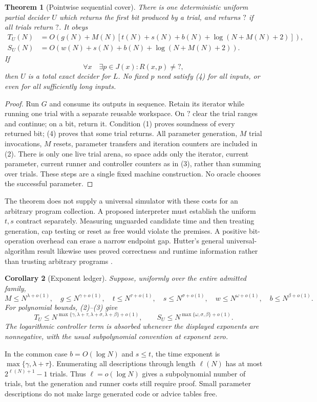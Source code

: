 \documentclass[11pt]{article}
\newtheorem{theorem}{Theorem}
\newtheorem{corollary}[theorem]{Corollary}
\begin{document}
\begin{theorem}[Pointwise sequential cover]\label{thm:cover}
There is one deterministic uniform partial decider $U$ which returns the first
bit produced by a trial, and returns $?$ if all trials return $?$.
It obeys
\begin{align}
 T_U(N)&=O\!\left(g(N)+M(N)[t(N)+s(N)+b(N)+\log(N+M(N)+2)]\right), \tag{2}\\
 S_U(N)&=O\!\left(w(N)+s(N)+b(N)+\log(N+M(N)+2)\right).           \tag{3}
\end{align}
If
\[
 \forall x\quad\exists p\in J(x):R(x,p)\ne ?,                 \tag{4}
\]
then $U$ is a total exact decider for $L$. No fixed $p$ need satisfy (4) for
all inputs, or even for all sufficiently long inputs.
\end{theorem}
\begin{proof}
Run $G$ and consume its outputs in sequence. Retain its iterator while running
one trial with a separate reusable workspace. On $?$ clear the trial ranges
and continue; on a bit, return it. Condition (1) proves soundness of every
returned bit; (4) proves that some trial returns. All parameter generation,
$M$ trial invocations, $M$ resets, parameter transfers and iteration counters
are included in (2). There is only one live trial arena, so space adds only
the iterator, current parameter, current runner and controller counters as in
(3), rather than summing over trials. These steps are a single fixed machine
construction. No oracle chooses the successful parameter.
\end{proof}

The theorem does not supply a universal simulator with these costs for an
arbitrary program collection. A proposed interpreter must establish the
uniform $t,s$ contract separately. Measuring unguarded candidate time and
then treating generation, cap testing or reset as free would violate the
premises. A positive bit-operation overhead can erase a narrow endpoint gap.
Hutter's general universal-algorithm result likewise uses proved correctness
and runtime information rather than trusting arbitrary programs \cite{hutter}.

\begin{corollary}[Exponent ledger]\label{cor:exponents}
Suppose, uniformly over the entire admitted family,
\[
 M\le N^{\lambda+o(1)},\quad g\le N^{\gamma+o(1)},\quad
 t\le N^{\tau+o(1)},\quad s\le N^{\sigma+o(1)},\quad
 w\le N^{\omega+o(1)},\quad b\le N^{\beta+o(1)}.
\]
For polynomial bounds, (2)--(3) give
\[
 T_U\le N^{\max\{\gamma,\lambda+\tau,\lambda+\sigma,
                         \lambda+\beta\}+o(1)},\qquad
 S_U\le N^{\max\{\omega,\sigma,\beta\}+o(1)}.             \tag{5}
\]
The logarithmic controller term is absorbed whenever the displayed exponents
are nonnegative, with the usual subpolynomial convention at exponent zero.
\end{corollary}
In the common case $b=O(\log N)$ and $s\le t$, the time exponent is
$\max\{\gamma,\lambda+\tau\}$. Enumerating all descriptions through length
$\ell(N)$ has at most $2^{\ell(N)+1}-1$ trials. Thus
$\ell=o(\log N)$ gives a subpolynomial number of trials, but the generation
and runner costs still require proof. Small parameter descriptions do not
make large generated code or advice tables free.
\end{document}

